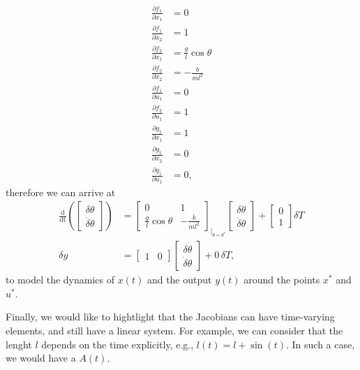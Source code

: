 \begin{align}
\frac{\partial f_1}{\partial x_1} &= 0 \nonumber \\
\frac{\partial f_1}{\partial x_2} &= 1 \nonumber \\
\frac{\partial f_2}{\partial x_1} &= \frac{g}{l}\cos\theta \nonumber \\
\frac{\partial f_2}{\partial x_2} &= -\frac{b}{ml^2} \nonumber \\
\frac{\partial f_1}{\partial u_1} &= 0 \nonumber \\
\frac{\partial f_2}{\partial u_1} &= 1 \nonumber \\
\frac{\partial g_1}{\partial x_1} &= 1 \nonumber \\
\frac{\partial g_1}{\partial x_2} &= 0 \nonumber \\
\frac{\partial g_1}{\partial u_1} &= 0, \nonumber
\end{align}
therefore we can arrive at
\begin{align}
	\frac{\mathrm{d}}{\mathrm{dt}}\left(\begin{bmatrix}\delta\theta \\ \dot\delta\theta \end{bmatrix}\right) &= \begin{bmatrix}0 & 1 \\ \frac{g}{l}\cos\theta & -\frac{b}{ml^2} \end{bmatrix}_{|_{\theta=\theta^*}} \begin{bmatrix}\delta\theta \\ \dot\delta\theta \end{bmatrix} + \begin{bmatrix}0 \\ 1 \end{bmatrix} \delta T \nonumber \\
		\delta y &= \begin{bmatrix}1 & 0\end{bmatrix}\begin{bmatrix}\delta\theta \\ \dot\delta\theta \end{bmatrix} + 0 \, \delta T,
\end{align}
to model the dynamics of $x(t)$ and the output $y(t)$ around the points $x^*$ and $u^*$.

Finally, we would like to hightlight that the Jacobians can have time-varying elements, and still have a linear system. For example, we can consider that the lenght $l$ depends on the time explicitly, e.g., $l(t) = l + \sin(t)$. In such a case, we would have a $A(t)$.

